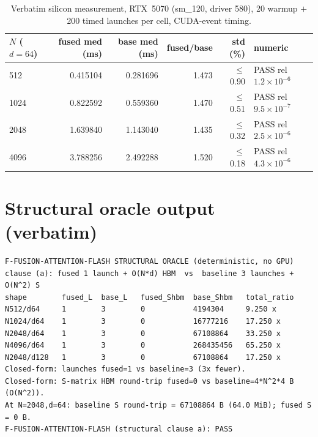 \documentclass[11pt,a4paper]{article}
\begin{document}
\begin{table}[h]
\centering
\caption{Verbatim silicon measurement, RTX~5070 (sm\_120, driver 580), 20 warmup
$+$ 200 timed launches per cell, CUDA-event timing.}
\label{tab:full}
\small
\begin{tabular}{@{}lrrrrl@{}}
\toprule
$N$ ($d{=}64$) & fused med (ms) & base med (ms) & fused/base & std (\%) & numeric \\
\midrule
512  & 0.415104 & 0.281696 & 1.473 & $\leq$0.90 & PASS rel $1.2\!\times\!10^{-6}$ \\
1024 & 0.822592 & 0.559360 & 1.470 & $\leq$0.51 & PASS rel $9.5\!\times\!10^{-7}$ \\
2048 & 1.639840 & 1.143040 & 1.435 & $\leq$0.32 & PASS rel $2.5\!\times\!10^{-6}$ \\
4096 & 3.788256 & 2.492288 & 1.520 & $\leq$0.18 & PASS rel $4.3\!\times\!10^{-6}$ \\
\bottomrule
\end{tabular}
\end{table}

\section{Structural oracle output (verbatim)}
\label{app:oracle}

\begin{lstlisting}
F-FUSION-ATTENTION-FLASH STRUCTURAL ORACLE (deterministic, no GPU)
clause (a): fused 1 launch + O(N*d) HBM  vs  baseline 3 launches + O(N^2) S
shape        fused_L  base_L   fused_Shbm  base_Shbm   total_ratio
N512/d64     1        3        0           4194304     9.250 x
N1024/d64    1        3        0           16777216    17.250 x
N2048/d64    1        3        0           67108864    33.250 x
N4096/d64    1        3        0           268435456   65.250 x
N2048/d128   1        3        0           67108864    17.250 x
Closed-form: launches fused=1 vs baseline=3 (3x fewer).
Closed-form: S-matrix HBM round-trip fused=0 vs baseline=4*N^2*4 B (O(N^2)).
At N=2048,d=64: baseline S round-trip = 67108864 B (64.0 MiB); fused S = 0 B.
F-FUSION-ATTENTION-FLASH (structural clause a): PASS
\end{lstlisting}



\end{document}
